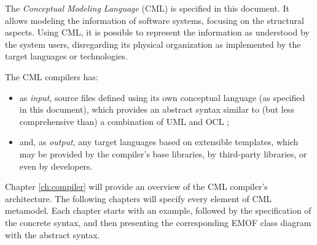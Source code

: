 The \emph{Conceptual Modeling Language} (CML) is specified in this document.
It allows modeling the information of software systems,
focusing on the structural aspects.
Using CML,
it is possible to represent the information as understood by the system users,
disregarding its physical organization as implemented by the target languages or technologies.

The CML compilers has:
\begin{itemize}
\item as \emph{input},
source files defined using its own conceptual language (as specified in this document),
which provides an abstract syntax similar to (but less comprehensive than) a combination of UML \cite{uml} and OCL \cite{ocl}; 
\item and, as \emph{output},
any target languages based on extensible templates,
which may be provided by the compiler's base libraries, by third-party libraries, or even by developers.
\end{itemize}

Chapter \ref{ch:compiler} will provide an overview of the CML compiler's architecture. The following chapters will specify every element of CML metamodel.
Each chapter starts with an example,
followed by the specification of the concrete syntax,
and then presenting the corresponding EMOF \cite{mof} class diagram with the abstract syntax.

